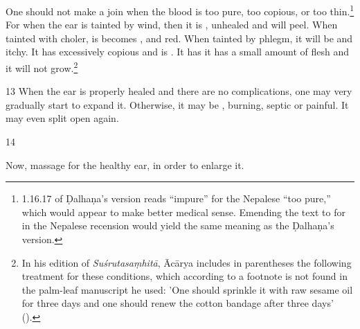 \begin{translation}
One should not make a join when the blood is too pure, too copious, or too
thin.\footnote{1.16.17 of Ḍalhaṇa's version \citep[79]{vulgate} reads “impure” for
    the Nepalese “too pure,” which would appear to make better medical sense. 
    Emending the text to  for  in the Nepalese
    recension would yield the same meaning as the Ḍalhaṇa's version.} For when the ear
    is tainted by wind, then it is , unhealed and
    will peel. When tainted with choler, is becomes ,
     and red.  When tainted by phlegm, it will be 
    and itchy.  It has excessively copious  and is .  It has it has a small amount of  flesh and it will
    not grow.\footnote{In his edition of \emph{Suśrutasaṃhitā}, Ācārya \citep[79 n.
        1]{vulgate} includes in parentheses the following treatment for these conditions,
        which according to a footnote is not found in the palm-leaf manuscript he used:
        'One should sprinkle it with raw sesame oil for three days and one should renew
        the cotton bandage after three days' ().}
    
\item[13] When the ear is properly healed and there are no complications,  one may
very gradually start to expand it.  Otherwise, it may be ,
burning, septic or painful.  It may even split open again.
    
\item [14]
    
Now, massage for the healthy ear, in order to enlarge it.
     

\end{translation}
